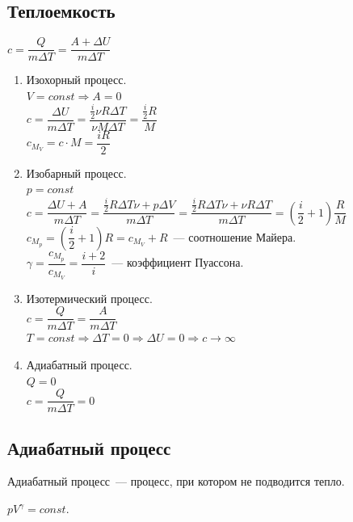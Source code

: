 \documentclass[12pt]{article}
\begin{document}
	\subsection{Теплоемкость}
	\begin{definition}[Теплоемкость]
		$c = \dfrac{Q}{m \varDelta T} = \dfrac{A + \varDelta U}{m \varDelta T}$
	\end{definition}
	\begin{enumerate}
		\item Изохорный процесс.\\
		$V = const \Rightarrow A = 0$\\
		$c = \dfrac{\varDelta U}{m \varDelta T} = \dfrac{\frac{i}{2} \nu R \varDelta T}{\nu M \varDelta T} = \dfrac{\frac{i}{2} R}{M}$\\
		$c_{M_V} = c \cdot M = \dfrac{iR}{2}$
		\item Изобарный процесс.\\
		$p = const$\\
		$c = \dfrac{\varDelta U + A}{m \varDelta T} = \dfrac{\frac{i}{2} R \varDelta T \nu + p \varDelta V}{m \varDelta T} = \dfrac{\frac{i}{2} R \varDelta T \nu + \nu R \varDelta T}{m \varDelta T} = \left( \dfrac{i}{2} + 1 \right) \dfrac{R}{M}$\\
		$c_{M_p} = \left( \dfrac{i}{2} + 1 \right) R = c_{M_V} + R$~--- соотношение Майера.\\
		$\gamma = \dfrac{c_{M_p}}{c_{M_V}} = \dfrac{i + 2}{i}$~--- коэффициент Пуассона.
		\item Изотермический процесс.\\
		$c = \dfrac{Q}{m \varDelta T} = \dfrac{A}{m \varDelta T}$\\
		$T = const \Rightarrow \varDelta T = 0 \Rightarrow \varDelta U = 0 \Rightarrow c \rightarrow \infty$
		\item Адиабатный процесс.\\
		$Q = 0$\\
		$c = \dfrac{Q}{m \varDelta T} = 0$
	\end{enumerate}
	\subsection{Адиабатный процесс}
	\begin{definition}
		Адиабатный процесс~--- процесс, при котором не подводится тепло.
	\end{definition}
	\begin{statement}
		$pV^\gamma = const$.
	\end{statement}
\end{document}
